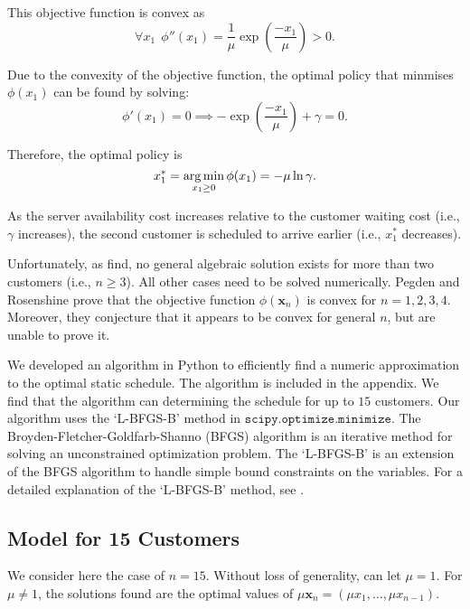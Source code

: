 This objective function is convex as
\begin{equation}
	\forall x_{1} \ \ \phi'' (x_{1}) = \frac{1}{\mu} \exp \left( \frac{- x_{1}}{\mu} \right) > 0.
\end{equation}

Due to the convexity of the objective function, the optimal policy that minmises $\phi (x_{1})$ can be found by solving:
\begin{equation}
	\phi' (x_{1}) = 0 \implies - \exp \left( \frac{- x_{1}}{\mu} \right) + \gamma = 0.
\end{equation}

Therefore, the optimal policy is
\begin{equation}
	x_{1}^{*} = \operatorname*{arg\,min}_{x_{1} \geq 0} \phi (x_{1}) = - \mu \ln \gamma.
\end{equation}

As the server availability cost increases relative to the customer waiting cost (i.e., $\gamma$ increases), the second customer is scheduled to arrive earlier (i.e., $x_{1}^{*}$ decreases).

Unfortunately, as \citet{Pegden} find, no general algebraic solution exists for more than two customers (i.e., $n \geq 3$). All other cases need to be solved numerically. Pegden and Rosenshine prove that the objective function $\phi (\mathbf{x}_{n})$ is convex for $n = 1, 2, 3, 4$. Moreover, they conjecture that it appears to be convex for general $n$, but are unable to prove it.

We developed an algorithm in Python to efficiently find a numeric approximation to the optimal static schedule. The algorithm is included in the appendix. We find that the algorithm can determining the schedule for up to $15$ customers. Our algorithm uses the `L-BFGS-B' method in $\texttt{scipy.optimize.minimize}$. The Broyden-Fletcher-Goldfarb-Shanno (BFGS) algorithm is an iterative method for solving an unconstrained optimization problem. The `L-BFGS-B' is an extension of the BFGS algorithm to handle simple bound constraints on the variables. For a detailed explanation of the `L-BFGS-B' method, see \citet{Byrd}.

\subsection{Model for 15 Customers}
We consider here the case of $n = 15$. Without loss of generality, can let $\mu = 1$. For $\mu \neq 1$, the solutions found are the optimal values of $\mu \mathbf{x}_{n} = (\mu x_{1}, \ldots, \mu x_{n - 1})$.

